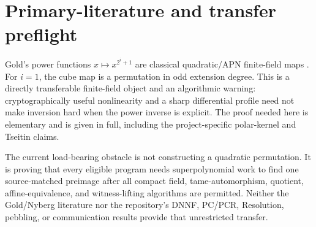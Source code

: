 \documentclass[11pt]{article}
\begin{document}
\section{Primary-literature and transfer preflight}
Gold's power functions $x\mapsto x^{2^i+1}$ are classical quadratic/APN
finite-field maps \cite{Gold,Nyberg}.  For $i=1$, the cube map is a
permutation in odd extension degree.  This is a directly transferable
finite-field object and an algorithmic warning: cryptographically useful
nonlinearity and a sharp differential profile need not make inversion hard
when the power inverse is explicit.  The proof needed here is elementary and
is given in full, including the project-specific polar-kernel and Tseitin
claims.

The current load-bearing obstacle is not constructing a quadratic
permutation.  It is proving that every eligible program needs
superpolynomial work to find one source-matched preimage after all compact
field, tame-automorphism, quotient, affine-equivalence, and witness-lifting
algorithms are permitted.  Neither the Gold/Nyberg literature nor the
repository's DNNF, PC/PCR, Resolution, pebbling, or communication results
provide that unrestricted transfer.
\end{document}
